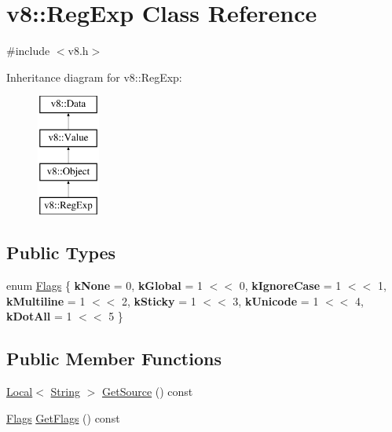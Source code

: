 \hypertarget{classv8_1_1RegExp}{}\section{v8\+:\+:Reg\+Exp Class Reference}
\label{classv8_1_1RegExp}


{\ttfamily \#include $<$v8.\+h$>$}

Inheritance diagram for v8\+:\+:Reg\+Exp\+:\begin{figure}[H]
\begin{center}
\leavevmode
\includegraphics[height=4.000000cm]{classv8_1_1RegExp}
\end{center}
\end{figure}
\subsection*{Public Types}
\begin{DoxyCompactItemize}
\item 
enum \mbox{\hyperlink{classv8_1_1RegExp_aa4718a5c1f18472aff3bf51ed694fc5a}{Flags}} \{ \newline
{\bfseries k\+None} = 0, 
{\bfseries k\+Global} = 1 $<$$<$ 0, 
{\bfseries k\+Ignore\+Case} = 1 $<$$<$ 1, 
{\bfseries k\+Multiline} = 1 $<$$<$ 2, 
\newline
{\bfseries k\+Sticky} = 1 $<$$<$ 3, 
{\bfseries k\+Unicode} = 1 $<$$<$ 4, 
{\bfseries k\+Dot\+All} = 1 $<$$<$ 5
 \}
\end{DoxyCompactItemize}
\subsection*{Public Member Functions}
\begin{DoxyCompactItemize}
\item 
\mbox{\hyperlink{classv8_1_1Local}{Local}}$<$ \mbox{\hyperlink{classv8_1_1String}{String}} $>$ \mbox{\hyperlink{classv8_1_1RegExp_a21bc6ac9419240fb1a774365c28cea08}{Get\+Source}} () const
\item 
\mbox{\hyperlink{classv8_1_1RegExp_aa4718a5c1f18472aff3bf51ed694fc5a}{Flags}} \mbox{\hyperlink{classv8_1_1RegExp_a1f3357d22f9f403ee7bdad393b740b7a}{Get\+Flags}} () const
\end{DoxyCompactItemize}
